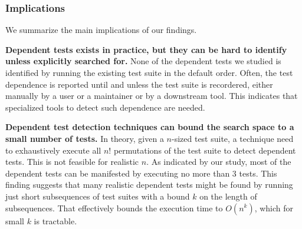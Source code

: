 





\subsubsection{Implications}

We summarize the main implications of our findings.

\noindent \textbf{{Dependent tests exists in practice, but
they can be hard to identify unless explicitly searched for.}}
None of the dependent tests we studied is identified by
running the existing test suite in the default order. Often,
the test dependence is reported until and unless the
test suite is recordered, either manually by a user or
a maintainer or by a downstream tool. This indicates that
specialized tools to detect such dependence are needed.

\vspace{1mm}
\noindent \textbf{Dependent test detection techniques
can bound the search space to a small number of tests.}
In theory, given a $n$-sized test suite, a technique need
to exhaustively execute all $n!$ permutations of the
test suite to detect dependent tests. This is
not feasible for realistic $n$. As indicated by our study,
most of the dependent tests can be manifested by executing
no more than 3 tests. This finding suggests that
many realistic dependent tests might be found by
running just short subsequences of test suites
with a bound $k$ on the length of subsequences. That
effectively bounds the execution time to $O(n^k)$,
which for small $k$ is tractable.

